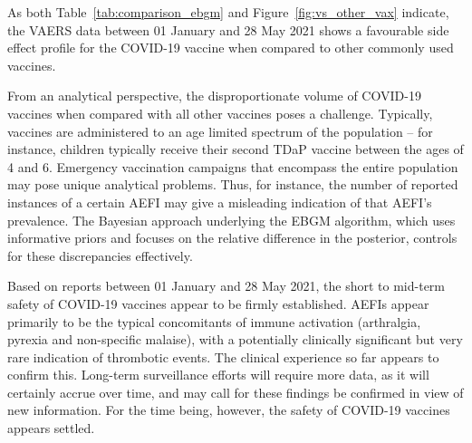 \documentclass[preprints,communication,submit,oneauthor,pdftex]{Definitions/mdpi}
\begin{document}
As both Table~\ref{tab:comparison_ebgm} and Figure~\ref{fig:vs_other_vax} indicate, the VAERS data between 01 January and 28 May 2021 shows a favourable side effect profile for the COVID-19 vaccine when compared to other commonly used vaccines.  

From an analytical perspective, the disproportionate volume of COVID-19 vaccines when compared with all other vaccines poses a challenge. Typically, vaccines are administered to an age limited spectrum of the population – for instance, children typically receive their second TDaP vaccine between the ages of 4 and 6. Emergency vaccination campaigns that encompass the entire population may pose unique analytical problems. Thus, for instance, the number of reported instances of a certain AEFI may give a misleading indication of that AEFI's prevalence. The Bayesian approach underlying the EBGM algorithm, which uses informative priors and focuses on the relative difference in the posterior, controls for these discrepancies effectively.

Based on reports between 01 January and 28 May 2021, the short to mid-term safety of COVID-19 vaccines appear to be firmly established. AEFIs appear primarily to be the typical concomitants of immune activation (arthralgia, pyrexia and non-specific malaise), with a potentially clinically significant but very rare indication of thrombotic events. The clinical experience so far appears to confirm this.\cite{shimabukuro2021covid,welsh2021thrombocytopenia} Long-term surveillance efforts will require more data, as it will certainly accrue over time, and may call for these findings be confirmed in view of new information. For the time being, however, the safety of COVID-19 vaccines appears settled.


\vspace{6pt} 








\end{document}
